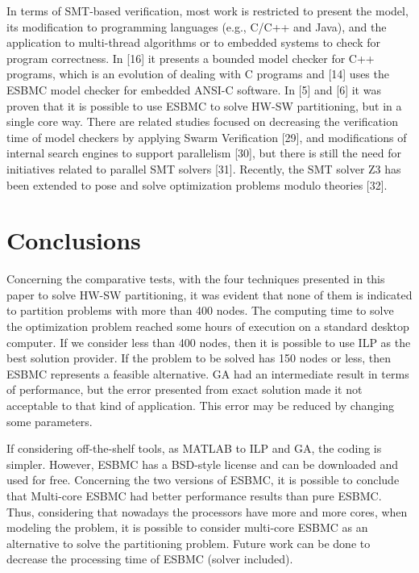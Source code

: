In terms of SMT-based verification, most work is restricted to present the model, its modification to programming languages (e.g., C/C++ and Java), and the application to multi-thread algorithms or to embedded systems to check for program correctness. In [16] it presents a bounded model checker for C++ programs, which is an evolution of dealing with C programs and [14] uses the ESBMC model checker for embedded ANSI-C software. In [5] and [6] it was proven that it is possible to use ESBMC to solve HW-SW partitioning, but in a single core way. There are related studies focused on decreasing the verification time of model checkers by applying Swarm Verification [29], and modifications of internal search engines to support parallelism [30], but there is still the need for initiatives related to parallel SMT solvers [31]. Recently, the SMT solver Z3 has been extended to pose and solve optimization problems modulo theories [32].

\section{Conclusions}

Concerning the comparative tests, with the four techniques presented in this paper to solve HW-SW partitioning, it was evident that none of them is indicated to partition problems with more than 400 nodes. The computing time to solve the optimization problem reached some hours of execution on a standard desktop computer. If we consider less than 400 nodes, then it is possible to use ILP as the best solution provider. If the problem to be solved has 150 nodes or less, then ESBMC represents a feasible alternative. GA had an intermediate result in terms of performance, but the error presented from exact solution made it not acceptable to that kind of application. This error may be reduced by changing some parameters.

If considering off-the-shelf tools, as MATLAB to ILP and GA, the coding is simpler. However, ESBMC has a BSD-style license and can be downloaded and used for free. Concerning the two versions of ESBMC, it is possible to conclude that Multi-core ESBMC had better performance results than pure ESBMC. Thus, considering that nowadays the processors have more and more cores, when modeling the problem, it is possible to consider multi-core ESBMC as an alternative to solve the partitioning problem. Future work can be done to decrease the processing time of ESBMC (solver included).

